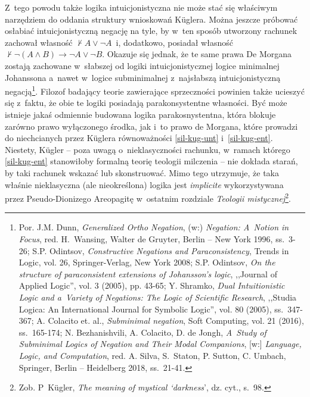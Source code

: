 Z~tego powodu także logika intuicjonistyczna nie może stać się właściwym narzędziem do oddania struktury wnioskowań Küglera. Można jeszcze próbować osłabiać intuicjonistyczną negację na tyle, by w~ten sposób utworzony rachunek zachował własność $\nvdash A \lor \neg A$~i, dodatkowo, posiadał własność $\nvdash \neg (A \land B) \to \neg A \lor \neg B$. Okazuje się jednak, że te same prawa De Morgana zostają zachowane w~słabszej od logiki intuicjonistycznej logice minimalnej Johanssona a~nawet w~logice subminimalnej z~najsłabszą intuicjonistyczną negacją\footnote{Por. J.M. Dunn, \textit{Generalized Ortho Negation}, (w:) \textit{Negation: A~Notion in Focus}, red. H.~Wansing, Walter de Gruyter, Berlin -- New York 1996, ss.~3-26; S.P. Odintsov, \textit{Constructive Negations and Paraconsistency}, Trends in Logic, vol. 26, Springer-Verlag, New York 2008; S.P. Odintsov, \textit{On the structure of paraconsistent extensions of Johansson's logic}, ,,Journal of Applied Logic'', vol. 3 (2005), pp. 43-65; Y. Shramko, \textit{Dual Intuitionistic Logic and a~Variety of Negations: The Logic of Scientific Research}, ,,Studia Logica: An International Journal for Symbolic Logic'', vol. 80 (2005), ss.~347-367; A. Colacito et. al., \textit{Subminimal negation}, Soft Computing, vol. 21 (2016), ss.~165-174; N. Bezhanishvili, A. Colacito, D. de Jongh, \textit{A~Study of Subminimal Logics of Negation and Their Modal Companions}, [w:] \textit{Language, Logic, and Computation}, red. A. Silva, S.~Staton, P. Sutton, C. Umbach, Springer, Berlin -- Heidelberg 2018, ss.~21-41.}. Filozof badający teorie zawierające sprzeczności powinien także ucieszyć się z~faktu, że obie te logiki posiadają parakonsystentne własności. Być może istnieje jakaś odmiennie budowana logika parakosnystentna, która blokuje zarówno prawo wyłączonego środka, jak i~to prawo de Morgana, które prowadzi do niechcianych przez Küglera równoważności \ref{sil-kug-unt} i~\ref{sil-kug-ent}. Niestety, Kügler -- poza uwagą o~nieklasyczności rachunku, w~ramach którego \ref{sil-kug-ent} stanowiłoby formalną teorię teologii milczenia -- nie dokłada starań, by taki rachunek wskazać lub skonstruować. Mimo tego utrzymuje, że taka właśnie nieklasyczna (ale nieokreślona) logika jest \textit{implicite} wykorzystywana przez Pseudo-Dionizego Areopagitę w~ostatnim rozdziale \textit{Teologii mistycznej}\footnote{Zob. P~Kügler, \textit{The meaning of mystical ‘darkness}', dz. cyt., s.~98.}.

